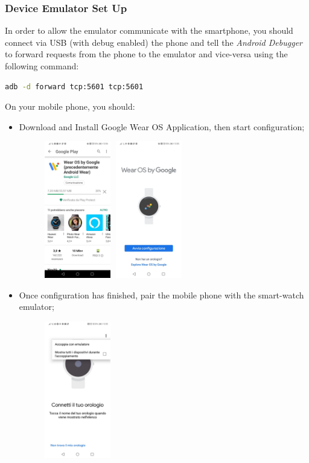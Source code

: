 \documentclass[a4paper]{article}
\begin{document}
\subsubsection{Device Emulator Set Up}
In order to allow the emulator communicate with the smartphone, you should connect via USB (with debug enabled) the phone and tell the \textit{Android Debugger} to forward requests from the phone to the emulator and vice-versa using the following command: 

\begin{lstlisting}[language=bash]
adb -d forward tcp:5601 tcp:5601
\end{lstlisting}

On your mobile phone, you should:
\begin{itemize}
    \item Download and Install Google Wear OS Application, then start configuration;
    \begin{figure}[!htpb]
    \centering
    \includegraphics[width=30mm, height=60mm]{ITD/images/wearos1.jpeg}
    \includegraphics[width=30mm, height=60mm]{ITD/images/wearos2.jpeg}
    \end{figure}
    \item Once configuration has finished, pair the mobile phone with the smart-watch emulator;
    \begin{figure}[!htpb]
    \centering
    \includegraphics[width=30mm, height=60mm]{ITD/images/wearos3.jpeg}

\end{figure}
\end{itemize}
\end{document}
